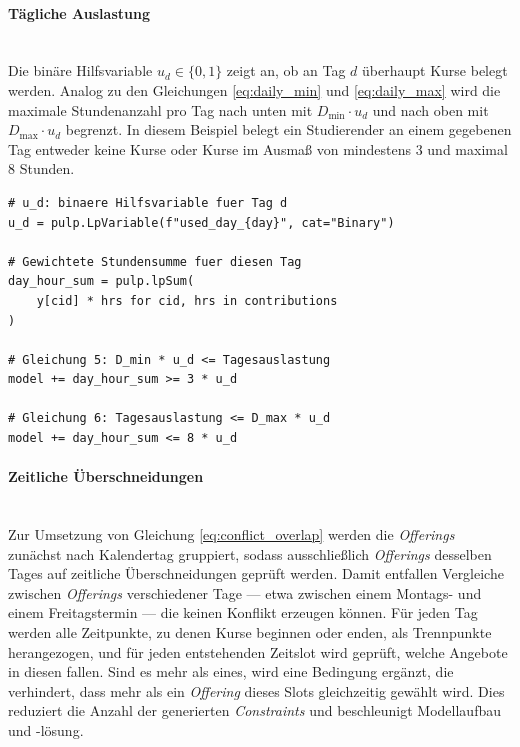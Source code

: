 \paragraph{Tägliche Auslastung}\hfill\\

Die binäre Hilfsvariable $u_d \in \{0,1\}$ zeigt an, ob an Tag $d$ überhaupt Kurse belegt werden. Analog zu den Gleichungen \ref{eq:daily_min} und \ref{eq:daily_max} wird die maximale Stundenanzahl pro Tag nach unten mit $D_{\min} \cdot u_d$ und nach oben mit $D_{\max} \cdot u_d$ begrenzt. In diesem Beispiel belegt ein Studierender an einem gegebenen Tag entweder keine Kurse oder Kurse im Ausmaß von mindestens 3 und maximal 8 Stunden.

\begin{lstlisting}[caption={Tägliche Auslastung},
                   label={lst:daily}]
# u_d: binaere Hilfsvariable fuer Tag d
u_d = pulp.LpVariable(f"used_day_{day}", cat="Binary")
 
# Gewichtete Stundensumme fuer diesen Tag
day_hour_sum = pulp.lpSum(
    y[cid] * hrs for cid, hrs in contributions
)
 
# Gleichung 5: D_min * u_d <= Tagesauslastung
model += day_hour_sum >= 3 * u_d
 
# Gleichung 6: Tagesauslastung <= D_max * u_d
model += day_hour_sum <= 8 * u_d
\end{lstlisting}



\paragraph{Zeitliche Überschneidungen}\hfill\\

Zur Umsetzung von Gleichung \ref{eq:conflict_overlap} werden die \textit{Offerings}
zunächst nach Kalendertag gruppiert, sodass ausschließlich \textit{Offerings} desselben
Tages auf zeitliche Überschneidungen geprüft werden.
Damit entfallen Vergleiche zwischen \textit{Offerings} verschiedener Tage --- etwa
zwischen einem Montags- und einem Freitagstermin --- die keinen
Konflikt erzeugen können.
Für jeden Tag werden alle Zeitpunkte, zu denen Kurse beginnen oder enden,
als Trennpunkte herangezogen, und für jeden entstehenden Zeitslot wird geprüft,
welche Angebote in diesen fallen.
Sind es mehr als eines, wird eine Bedingung ergänzt, die verhindert,
dass mehr als ein \textit{Offering} dieses Slots gleichzeitig gewählt wird.
Dies reduziert die Anzahl der generierten \textit{Constraints} und beschleunigt Modellaufbau und -lösung.

